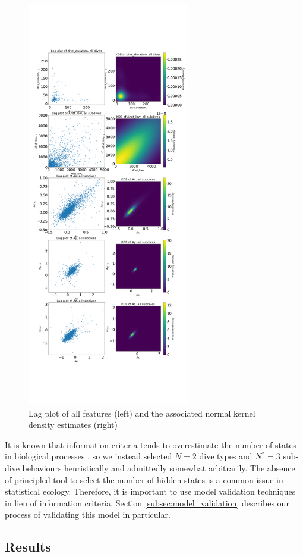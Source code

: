 \begin{figure}[ht]
	\centering
	\includegraphics[height=7in]{../Plots/lagplot.png}
	\caption{Lag plot of all features (left) and the associated normal kernel density estimates (right)}
	\label{fig:lag}
\end{figure}

It is known that information criteria tends to overestimate the number of states in biological processes \citep{Pohle:2017}, so we instead selected $N = 2$ dive types and $N^* = 3$ sub-dive behaviours heuristically and admittedly somewhat arbitrarily. The absence of principled tool to select the number of hidden states is a common issue in statistical ecology. Therefore, it is important to use model validation techniques in lieu of information criteria. Section \ref{subsec:model_validation} describes our process of validating this model in particular.

\subsection{Results}

